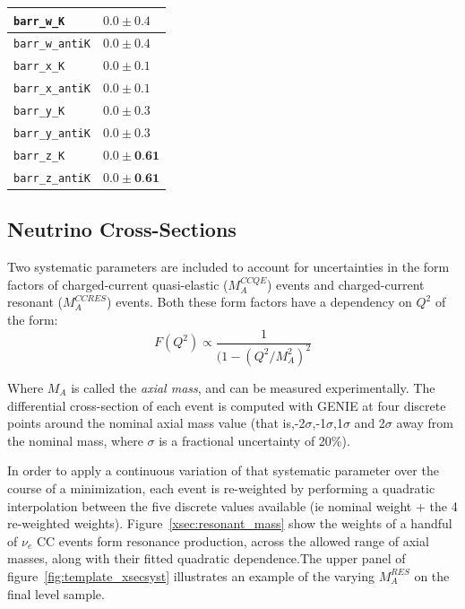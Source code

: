 \begin{table}
\begin{center}
\begin{tabular}{ |l|l| }
\texttt{barr\_w\_K} &  $0.0 \pm 0.4$ \\ \hline
\texttt{barr\_w\_antiK} &  $0.0 \pm 0.4$ \\ \hline
\texttt{barr\_x\_K} &  $0.0 \pm 0.1$ \\ \hline
\texttt{barr\_x\_antiK} &  $0.0 \pm 0.1$ \\ \hline
\texttt{barr\_y\_K} &  $0.0 \pm 0.3$ \\ \hline
\texttt{barr\_y\_antiK} &  $0.0 \pm 0.3$ \\ \hline
\texttt{barr\_z\_K} &  $0.0 \pm \textbf{0.61}$ \\ \hline
\texttt{barr\_z\_antiK} &  $0.0 \pm \textbf{0.61}$ \\ \hline

\end{tabular}
\end{center}
\end{table}


\subsection{Neutrino Cross-Sections}
\label{section:xsec_systs}
Two systematic parameters are included to account for uncertainties in the form factors of charged-current quasi-elastic ($M_{A}^{CCQE}$) events and charged-current resonant ($M_{A}^{CCRES}$) events. Both these form factors have a dependency on $Q^2$ of the form:\\

\begin{equation}
    F(Q^{2}) \propto \frac{1}{(1-(Q^{2}/M_{A}^{2})^{2}}
\end{equation}

Where $M_{A}$ is called the \textit{axial mass}, and can be measured experimentally.  The differential cross-section of each event is computed with GENIE at four discrete points around the nominal axial mass value (that is,-2$\sigma$,-1$\sigma$,1$\sigma$ and 2$\sigma$ away from the nominal mass, where $\sigma$ is a fractional uncertainty of 20\%).

In order to apply a continuous variation of that systematic parameter over the course of a minimization, each event is re-weighted by performing a quadratic interpolation between the five discrete values available (ie nominal weight + the 4 re-weighted weights). Figure~\ref{xsec:resonant_mass} show the weights of a handful of $\nu_{e}$ CC events form resonance production, across the allowed range of axial masses, along with their fitted quadratic dependence.The upper panel of figure~\ref{fig:template_xsecsyst} illustrates an example of the varying $M_{A}^{RES}$ on the final level sample.

